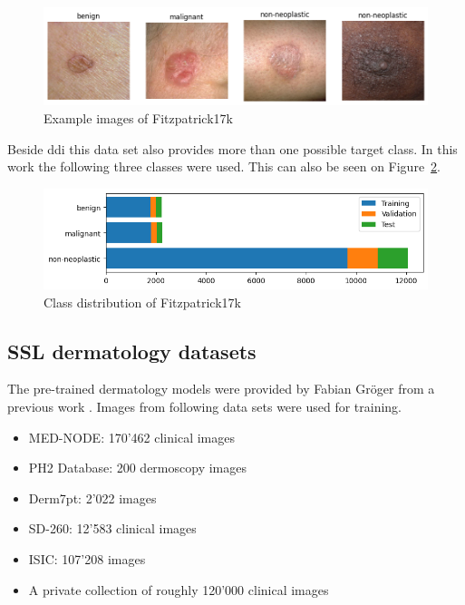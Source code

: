 \begin{figure}[H]
    \begin{center}
    \includegraphics[width=15cm]{../../images/example_images_of_fitzpatrick17k.png}
    \caption{Example images of Fitzpatrick17k}\label{fig:example_images_of_fitzpatrick17k}
    \end{center}
\end{figure}

Beside \gls{ddi} this data set also provides more than one possible target class. In this work the following three classes were used. This can also be seen on Figure~\ref{fig:class_distribution_of_fitzpatrick17k}.

\begin{figure}[H]
    \begin{center}
    \includegraphics[width=15cm]{../../images/class_distribution_of_fitzpatrick17k.png}
    \caption{Class distribution of Fitzpatrick17k}\label{fig:class_distribution_of_fitzpatrick17k}
    \end{center}
\end{figure}

\subsection{SSL dermatology datasets}
The pre-trained dermatology models were provided by Fabian Gröger from a previous work \autocite{groeger2023}. Images from following data sets were used for training.


\begin{itemize}
    \item MED-NODE: 170'462 clinical images \autocite{giotis2015}
    \item PH2 Database: 200 dermoscopy images \autocite{mendonca2013}
    \item Derm7pt: 2'022 images \autocite{kawahara2019}
    \item SD-260: 12'583 clinical images \autocite{sun2016}
    \item ISIC: 107'208 images \autocite{giotis2015}
    \item A private collection of roughly 120'000 clinical images 
\end{itemize}
